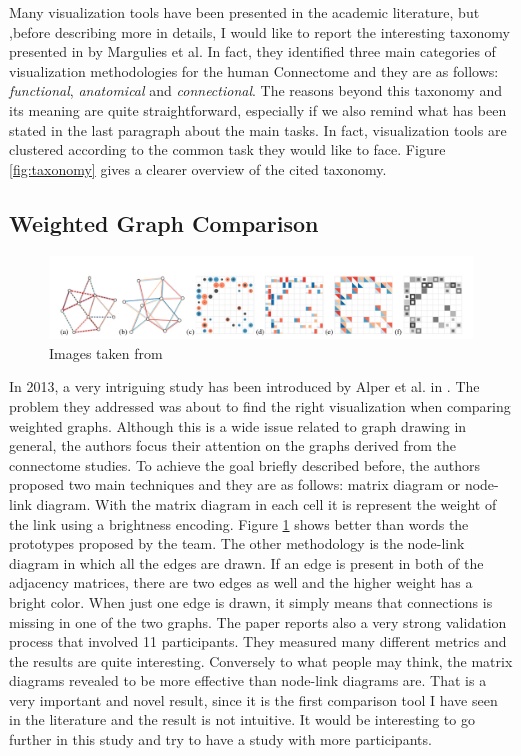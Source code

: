 \documentclass{article}
\begin{document}
\begin{multicols}{2}
Many visualization tools have been presented in the academic literature, but ,before describing more in details, I would like to report the interesting taxonomy presented in \cite{visualizingHumanConnectome} by Margulies et al. In fact, they identified three main categories of visualization methodologies for the human Connectome and they are as follows: \textit{functional}, \textit{anatomical} and \textit{connectional}. The reasons beyond this taxonomy and its meaning are quite straightforward, especially if we also remind what has been stated in the last paragraph about the main tasks. In fact, visualization tools are clustered according to the common task they would like to face. Figure \ref{fig:taxonomy} gives a clearer overview of the cited taxonomy. 

\subsection{Weighted Graph Comparison}
\begin{figure}[ht]
\centering
\includegraphics[width = 1.8\columnwidth]{weightedGraphs}
\caption{Images taken from \cite{weightedGraphComparison}}
\label{fig:weightedGraph}
\end{figure}
In 2013, a very intriguing study has been introduced by Alper et al. in \cite{weightedGraphComparison}. The problem they addressed was about to find the right visualization when comparing weighted graphs. Although this is a wide issue related to graph drawing in general, the authors focus their attention on the graphs derived from the connectome studies. To achieve the goal briefly described before, the authors proposed two main techniques and they are as follows: matrix diagram or node-link diagram. With the matrix diagram in each cell it is represent the weight of the link using a brightness encoding. Figure \ref{fig:weightedGraph} shows better than words the prototypes proposed by the team. The other methodology is the node-link diagram in which all the edges are drawn. If an edge is present in both of the adjacency matrices, there are two edges as well and the higher weight has a bright color. When just one edge is drawn, it simply means that connections is missing in one of the two graphs.
The paper reports also a very strong validation process that involved 11 participants. They measured many different metrics and the results are quite interesting. Conversely to what people may think, the matrix diagrams revealed to be more effective than node-link diagrams are. That is a very important and novel result, since it is the first comparison tool I have seen in the literature and the result is not intuitive. It would be interesting to go further in this study and try to have a study with more participants.\\

\end{multicols}
\end{document}
